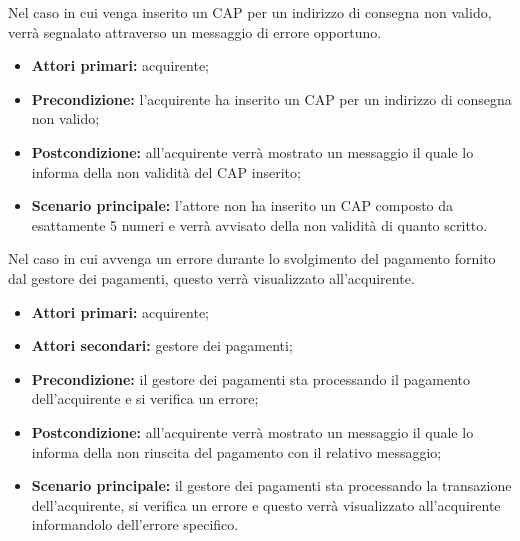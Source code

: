 Nel caso in cui venga inserito un CAP per un indirizzo di consegna non valido, verrà segnalato attraverso un messaggio di errore opportuno.
\begin{itemize}
	\item \textbf{Attori primari:} acquirente;
	\item \textbf{Precondizione:} l'acquirente ha inserito un CAP per un indirizzo di consegna non valido;
	\item \textbf{Postcondizione:} all'acquirente verrà mostrato un messaggio il quale lo informa della non validità del CAP inserito;
	\item \textbf{Scenario principale:} l'attore non ha inserito un CAP composto da esattamente 5 numeri e verrà avvisato della non validità di quanto scritto.
\end{itemize}

Nel caso in cui avvenga un errore durante lo svolgimento del pagamento fornito dal gestore dei pagamenti, questo verrà visualizzato all'acquirente.
\begin{itemize}
	\item \textbf{Attori primari:} acquirente;
	\item \textbf{Attori secondari:} gestore dei pagamenti;
	\item \textbf{Precondizione:} il gestore dei pagamenti sta processando il pagamento dell'acquirente e si verifica un errore;
	\item \textbf{Postcondizione:} all'acquirente verrà mostrato un messaggio il quale lo informa della non riuscita del pagamento con il relativo messaggio;
	\item \textbf{Scenario principale:} il gestore dei pagamenti sta processando la transazione dell'acquirente, si verifica un errore e questo verrà visualizzato all'acquirente informandolo dell'errore specifico.
\end{itemize}